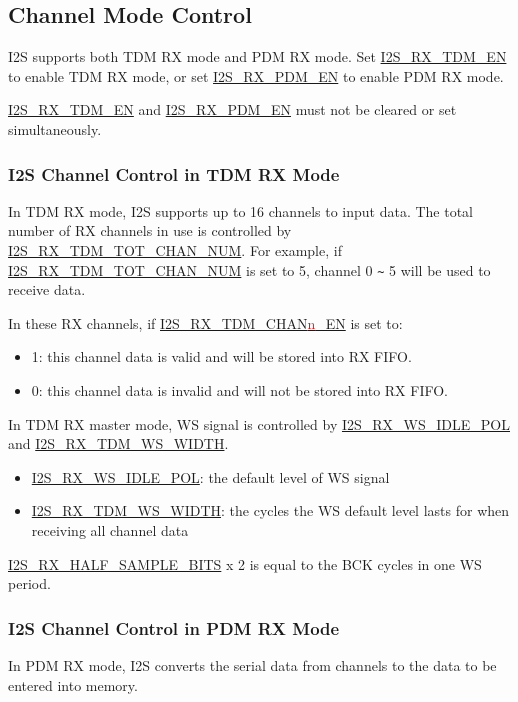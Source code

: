 \documentclass[main\_\_EN.tex]{subfiles}
\begin{document}
\subsection{Channel Mode Control}
\chipname{} I2S supports both TDM RX mode and PDM RX mode. Set \hyperref[fielddesc:I2SRXTDMEN]{I2S\_RX\_TDM\_EN} to enable TDM RX mode, or set \hyperref[fielddesc:I2SRXPDMEN]{I2S\_RX\_PDM\_EN} to enable PDM RX mode.

\begin{tiplisting}
\hyperref[fielddesc:I2SRXTDMEN]{I2S\_RX\_TDM\_EN} and \hyperref[fielddesc:I2SRXPDMEN]{I2S\_RX\_PDM\_EN} must not be cleared or set simultaneously.
\end{tiplisting}

\subsubsection{I2S Channel Control in TDM RX Mode}
In TDM RX mode, I2S supports up to 16 channels to input data. The total number of RX channels in use is controlled by \hyperref[fielddesc:I2SRXTDMTOTCHANNUM]{I2S\_RX\_TDM\_TOT\_CHAN\_NUM}. For example, if  \hyperref[fielddesc:I2SRXTDMTOTCHANNUM]{I2S\_RX\_TDM\_TOT\_CHAN\_NUM} is set to 5, channel 0 \verb+~+ 5 will be used to receive data.

In these RX channels, if \hyperref[fielddesc:I2STXTDMCHAN0EN]{I2S\_RX\_TDM\_CHAN{\textcolor{red}{n}}\_EN} is set to:
\begin{itemize}
    \item 1: this channel data is valid and will be stored into RX FIFO.
    \item 0: this channel data is invalid and will not be stored into RX FIFO.
\end{itemize}
In TDM RX master mode, WS signal is controlled by \hyperref[fielddesc:I2SRXWSIDLEPOL]{I2S\_RX\_WS\_IDLE\_POL} and \hyperref[fielddesc:I2SRXTDMWSWIDTH]{I2S\_RX\_TDM\_WS\_WIDTH}.
\begin{itemize}
    \item \hyperref[fielddesc:I2SRXWSIDLEPOL]{I2S\_RX\_WS\_IDLE\_POL}: the default level of WS signal
    \item \hyperref[fielddesc:I2SRXTDMWSWIDTH]{I2S\_RX\_TDM\_WS\_WIDTH}: the cycles the WS default level lasts for when receiving all channel data
\end{itemize}
\hyperref[fielddesc:I2SRXHALFSAMPLEBITS]{I2S\_RX\_HALF\_SAMPLE\_BITS} x 2 is equal to the BCK cycles in one WS period.

\subsubsection{I2S Channel Control in PDM RX Mode} 
In PDM RX mode, I2S converts the serial data from channels to the data to be entered into memory.
\end{document}
